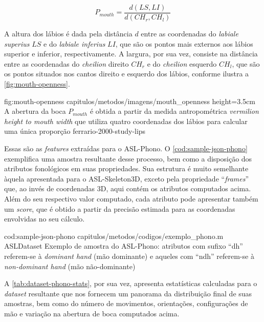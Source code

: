 \begin{enumerate}
          \begin{equation}
              \label{eqn:mouth-openness}
              P_{mouth} = \frac{d(LS, LI)}{d(CH_r, CH_l)}
          \end{equation}

          A altura dos lábios é dada pela distância \(d\) entre as coordenadas do \textit{labiale superius} \(LS\) e do \textit{labiale inferius} \(LI\), que são os pontos mais externos aos lábios superior e inferior, respectivamente. A largura, por sua vez, consiste na distância entre as coordenadas do \textit{cheilion} direito \(CH_r\) e do \textit{cheilion} esquerdo \(CH_l\), que são os pontos situados nos cantos direito e esquerdo dos lábios, conforme ilustra a \autoref{fig:mouth-openness}.

          \figura
          {fig:mouth-openness} %
          {capitulos/metodos/imagens/mouth_openness} %
          {height=3.5cm} %
          {A abertura da boca \(P_{mouth}\) é obtida a partir da medida antropométrica \textit{vermilion height to mouth width} que utiliza quatro coordenadas dos lábios para calcular uma única proporção} %
          {ferrario-2000-study-lips} %

\end{enumerate}


Essas são as \textit{features} extraídas para o ASL-Phono.
O \autoref{cod:sample-json-phono} exemplifica uma amostra resultante desse processo, bem como a disposição dos atributos fonológicos em suas propriedades.
Sua estrutura é muito semelhante àquela apresentada para o ASL-Skeleton3D, exceto pela propriedade ``\textit{frames}'' que, ao invés de coordenadas 3D, aqui contém os atributos computados acima. Além do seu respectivo valor computado, cada atributo pode apresentar também um \textit{score}, que é obtido a partir da precisão estimada para as coordenadas envolvidas no seu cálculo.

\codigo
    {cod:sample-json-phono}
    {capitulos/metodos/codigos/exemplo_phono.m}
    {ASLDataset}
    {Exemplo de amostra do ASL-Phono: atributos com sufixo ``dh'' referem-se à \textit{dominant hand} (mão dominante) e aqueles com ``ndh'' referem-se à \textit{non-dominant hand} (mão não-dominante)}
    {}



A \autoref{tab:dataset-phono-stats}, por sua vez, apresenta estatísticas calculadas para o \textit{dataset} resultante que nos fornecem um panorama da distribuição final de suas amostras, bem como do número de movimentos, orientações, configurações de mão e variação na abertura de boca computados acima.

